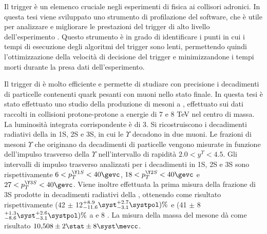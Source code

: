 Il trigger \`e un elemenco cruciale negli esperimenti di fisica ai collisori adronici. 
In questa tesi viene sviluppato uno strumento di profilazione del software, che \`e 
utile per analizzare e migliorare le prestazioni del trigger di alto livello dell'esperimento 
\lhcb. Questo strumento \`e in grado di identificare i punti in cui i tempi di esecuzione 
degli algoritmi del trigger sono lenti, permettendo quindi l'ottimizzazione della 
velocit\`a di decisione del trigger e minimizzandone i tempi morti durante la presa dati 
dell'esperimento. 

Il trigger di \lhcb \`e molto efficiente e permette di studiare con precisione i decadimenti 
di particelle contenenti quark pesanti con muoni nello stato finale. 
In questa tesi \`e stato effettuato uno studio della produzione di mesoni \chib a \lhcb, 
effettuato sui dati raccolti in collisioni protone-protone a energie di 7 e 8 TeV nel 
centro di massa. La luminosit\`a integrata corrispondente \`e di 3\invfb. 
Si ricostruiscono i decadimenti radiativi della \chib in  
\Y1S, \Y2S e \Y3S, in cui le $\Upsilon$ decadono in due muoni. 
Le frazioni di mesoni $\Upsilon$ che originano da decadimenti di particelle \chib 
vengono misurate in funzione dell'impulso trasverso della 
$\Upsilon$ nell'intervallo di rapidit\`a 
$2.0 < y^{\Upsilon} < 4.5$. Gli intervalli di impulso trasverso analizzati per 
i decadimenti in \Y1S, \Y2S e \Y3S sono rispettivamente  $6<p_T^{\Y1S}<40\gevc$, 
$18<p_T^{\Y2S}<40\gevc$ e $27<p_T^{\Y3S}<40\gevc$. 
Viene inoltre effettuata la prima misura della frazione di \Y3S prodotte in decadimenti radiativi della 
\chibThreeP, ottenendo come risultato rispettivamente 
(42 $\pm$ 12\stat${}^{+8.9}_{-11.6}\syst^{+2.7}_{-3.1}\systpol) \%$ e 
(41 $\pm$ 8\stat${}^{+1.3}_{-8.6}\syst^{+2.6}_{-3.1}\systpol) \%$ a  e 8 \tev. 
La misura della massa del mesone \chiboneThreeP d\`a come risultato $10{,}508 \pm 2\stat \pm
8\syst \mevcc$.


